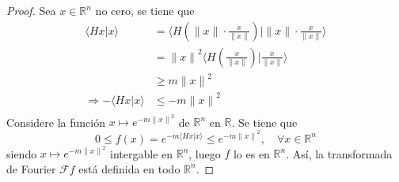 \documentclass[12pt]{report}
\newcounter{it}
\theoremstyle{largebreak}
\renewcommand{\leq}{\ensuremath{\leqslant}}
\renewcommand{\geq}{\ensuremath{\geqslant}}
\newcommand\norm[1]{\ensuremath{\|#1\|}}
\newcommand\pint[2]{\ensuremath{\langle#1| #2\rangle}}
\newcommand{\fou}[1]{\ensuremath{\mathcal{F}#1}}
\begin{document}
\begin{proof}
        Sea $x\in\mathbb{R}^n$ no cero, se tiene que
        \begin{equation*}
            \begin{split}
                \pint{Hx}{x}
                &=\pint{H\left(\norm{x}\cdot\frac{x}{\norm{x}}\right)}{\norm{x}\cdot\frac{x}{\norm{x}}}\\
                &=\norm{x}^2\pint{H\left(\frac{x}{\norm{x}}\right)}{\frac{x}{\norm{x}}}\\
                &\geq m\norm{x}^2\\
                \Rightarrow -\pint{Hx}{x}&\leq -m\norm{x}^2\\
            \end{split}
        \end{equation*}
        Considere la función $x\mapsto e^{ -m\norm{x}^2}$ de $\mathbb{R}^n$ en $\mathbb{R}$. Se tiene que
        \begin{equation*}
            0\leq f(x)=e^{ -m\pint{Hx}{x}}\leq e^{ -m\norm{x}^2},\quad\forall x\in\mathbb{R}^n
        \end{equation*}
        siendo $x\mapsto e^{ -m\norm{x}^2}$ intergable en $\mathbb{R}^n$, luego $f$ lo es en $\mathbb{R}^n$. Así, la transformada de Fourier $\fou{f}$ está definida en todo $\mathbb{R}^n$.


\end{proof}
\end{document}
